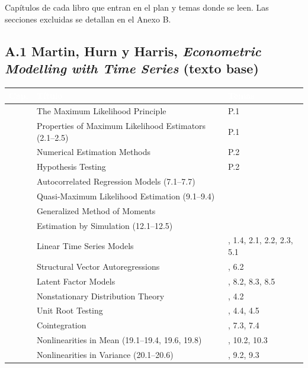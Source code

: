 \documentclass[11pt,a4paper]{article}
\newcommand{\cab}[1]{\textcolor{white}{\sffamily\bfseries #1}}
\newcommand{\filasalternas}{\rowcolors{2}{white}{tonoPalido}}
\begin{document}
Capítulos de cada libro que entran en el plan y temas donde se leen. Las
secciones excluidas se detallan en el Anexo B.

\newcommand{\mapa}[2]{%
\subsection*{#1}
{\small\filasalternas
\noindent\begin{tabularx}{\textwidth}{>{\raggedright\arraybackslash}p{1.1cm}X>{\raggedright\arraybackslash}p{3.8cm}}
\toprule
\rowcolor{tonoOscuro}\cab{Cap.} & \cab{Título} & \cab{Temas} \\
\midrule
#2
\bottomrule
\end{tabularx}
}}

\mapa{A.1 Martin, Hurn y Harris, \emph{Econometric Modelling with Time Series} (texto base)}{%
1 & The Maximum Likelihood Principle & P.1 \\
2 & Properties of Maximum Likelihood Estimators (2.1--2.5) & P.1 \\
3 & Numerical Estimation Methods & P.2 \\
4 & Hypothesis Testing & P.2 \\
7 & Autocorrelated Regression Models (7.1--7.7) & 3.2 \\
9 & Quasi-Maximum Likelihood Estimation (9.1--9.4) & 9.1 \\
10 & Generalized Method of Moments & 13.3 \\
12 & Estimation by Simulation (12.1--12.5) & 13.3 \\
13 & Linear Time Series Models & 1.1, 1.4, 2.1, 2.2, 2.3, 5.1 \\
14 & Structural Vector Autoregressions & 6.1, 6.2 \\
15 & Latent Factor Models & 8.1, 8.2, 8.3, 8.5 \\
16 & Nonstationary Distribution Theory & 4.1, 4.2 \\
17 & Unit Root Testing & 4.3, 4.4, 4.5 \\
18 & Cointegration & 7.2, 7.3, 7.4 \\
19 & Nonlinearities in Mean (19.1--19.4, 19.6, 19.8) & 10.1, 10.2, 10.3 \\
20 & Nonlinearities in Variance (20.1--20.6) & 9.1, 9.2, 9.3 \\
}
\end{document}
